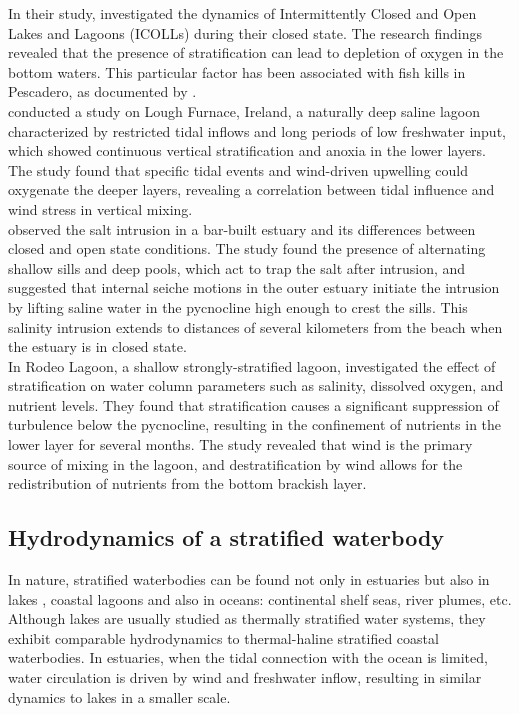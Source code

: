 \documentclass[tesis.tex]{subfiles}
\begin{document}
In their study, \cite{Gale2006} investigated the dynamics of Intermittently Closed and Open Lakes and Lagoons (ICOLLs) during their closed state. The research findings revealed that the presence of stratification can lead to  depletion of oxygen in the bottom waters. This particular factor has been associated with fish kills in Pescadero, as documented by \citep{largier2015}.\\

\cite{Kelly2018} conducted a study on Lough Furnace, Ireland, a naturally deep saline lagoon characterized by restricted tidal inflows and long periods of low freshwater input, which showed continuous vertical stratification and anoxia in the lower layers. The study found that specific tidal events and wind-driven upwelling could oxygenate the deeper layers, revealing a correlation between tidal influence and wind stress in vertical mixing.\\

\cite{Behrens2016} observed the salt intrusion in a bar-built estuary and its differences between closed and open state conditions. The study found the presence of alternating shallow sills and deep pools, which act to trap the salt after intrusion, and suggested that internal seiche motions in the outer estuary initiate the intrusion by lifting saline water in the pycnocline high enough to crest the sills. This salinity intrusion extends to distances of several kilometers from the beach when the estuary is in closed state.\\

In Rodeo Lagoon, a shallow strongly-stratified lagoon, \citep{Cousins2010} investigated the effect of stratification on water column parameters such as salinity, dissolved oxygen, and nutrient levels. They found that stratification causes a significant suppression of turbulence below the pycnocline, resulting in the confinement of nutrients in the lower layer for several months. The study revealed that wind is the primary source of mixing in the lagoon, and destratification by wind allows for the redistribution of nutrients from the bottom brackish layer.\\

\subsection{Hydrodynamics of a stratified waterbody}

In nature, stratified waterbodies can be found not only in estuaries \citep{human2016} but also in lakes \citep{Valerio2012, Imam2013, Coman2012}, coastal lagoons \citep{Cousins2010} and also in oceans: continental shelf seas, river plumes, etc. Although lakes are usually studied as thermally stratified water systems, they exhibit comparable hydrodynamics to thermal-haline stratified coastal waterbodies. In estuaries, when the tidal connection with the ocean is limited, water circulation is driven by wind and freshwater inflow, resulting in similar dynamics to lakes in a smaller scale. \\
\end{document}
